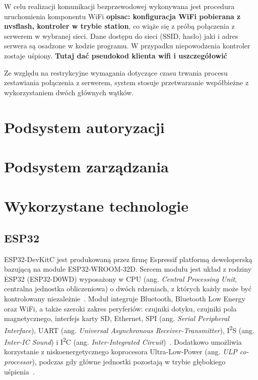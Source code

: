                 W celu realizacji komunikacji bezprzewodowej wykonywana jest procedura uruchomienia komponentu WiFi \textbf{opisac: konfiguracja WiFi pobierana z nvsflash, kontroler w trybie station}, co wiąże się z próbą połączenia z serwerem w wybranej sieci. Dane dostępu do sieci (SSID, hasło) jaki i adres serwera są osadzone w kodzie programu. W przypadku niepowodzenia kontroler zostaje uśpiony. \textbf{Tutaj dać pseudokod klienta wifi i uszczegółowić}

                

                Ze względu na restrykcyjne wymagania dotyczące czasu trwania procesu zestawiania połączenia z serwerem, system stosuje przetwarzanie współbieżne z wykorzystaniem dwóch głównych wątków.

    \section{Podsystem autoryzacji}

    \section{Podsystem zarządzania}

    \section {Wykorzystane technologie}

        \subsection{ESP32}

            ESP32-DevKitC jest produkowaną przez firmę Espressif platformą deweloperską bazującą na module ESP32-WROOM-32D. Sercem modułu jest układ z rodziny ESP32 (ESP32-D0WD) wyposażony w CPU (ang. \textit{Central Processing Unit}, centralna jednostka obliczeniowa) o dwóch rdzeniach, z których każdy może być kontrolowany niezależnie~\cite{esp32-wroom32-ds}. Moduł integruje Bluetooth, Bluetooth Low Energy oraz WiFi, a także szeroki zakres peryferiów: czujniki dotyku, czujniki pola magnetycznego, interfejs karty SD, Ethernet, SPI (ang. \textit{Serial Peripheral Interface}), UART (ang. \textit{Universal Asynchronous Receiver-Transmitter}), I\textsuperscript{2}S (ang. \textit{Inter-IC Sound}) i I\textsuperscript{2}C (ang. \textit{Inter-Integrated Circuit})~\cite{esp32-wroom32-ds}. Dodatkowo umożliwia korzystanie z niskoenergetycznego koprocesora Ultra-Low-Power (ang. \textit{ULP co-processor}), podczas gdy główne jednostki pozostają w trybie głębokiego uśpienia~\cite{esp32-tech-ref-man}.

